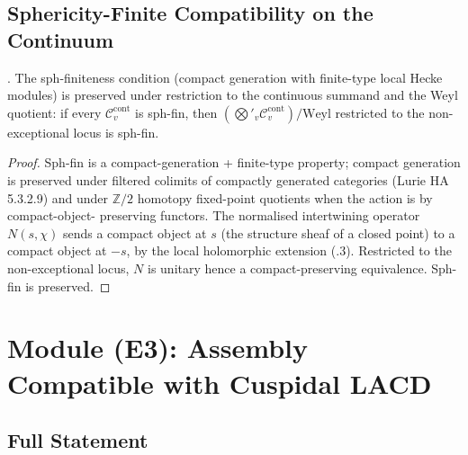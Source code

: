 \subsection{Sphericity-Finite Compatibility on the Continuum}

\begin{proposition}
\label{v4-arith:w6-d:prop:sph-fin-cont}
\ClaimStatusProvedHere. The sph-finiteness condition (compact
generation with finite-type local Hecke modules) is preserved
under restriction to the continuous summand and the Weyl quotient:
if every \(\mathcal{C}^{\mathrm{cont}}_{v}\) is sph-fin, then
\((\bigotimes'_{v}\mathcal{C}^{\mathrm{cont}}_{v})/\mathrm{Weyl}\)
restricted to the non-exceptional locus is sph-fin.
\end{proposition}

\begin{proof}
Sph-fin is a compact-generation + finite-type property; compact
generation is preserved under filtered colimits of compactly
generated categories (Lurie HA 5.3.2.9) and under \(\mathbb{Z}/2\)
homotopy fixed-point quotients when the action is by compact-object-
preserving functors. The normalised intertwining operator
\(N(s,\chi)\) sends a compact object at \(s\) (the structure sheaf of a
closed point) to a compact object at \(-s\), by the local holomorphic
extension (.3). Restricted to the
non-exceptional locus, \(N\) is unitary hence a compact-preserving
equivalence. Sph-fin is preserved.
\end{proof}

\section{Module (E3): Assembly Compatible with Cuspidal LACD}
\label{v4-arith:w6-d:E3}

\subsection{Full Statement}

